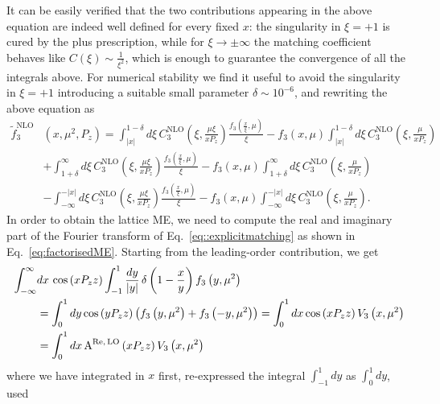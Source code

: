 It can be easily verified that the two contributions appearing in the above
equation are indeed well defined for every fixed $x$: the singularity in
$\xi=+1$ is cured by the plus prescription, while for $\xi\rightarrow \pm
\infty$ the matching coefficient behaves like $C\left(\xi\right)\sim
\frac{1}{\xi^2}$, which is enough to guarantee the convergence of all the
integrals above. For numerical stability we find it useful to avoid the
singularity in $\xi = +1$ introducing a suitable small parameter $\delta \sim
10^{-6}$, and rewriting the above equation as
\begin{equation}
	\label{eq::explicitplus}
	\begin{split}
		\tilde{f}_3^{\text{NLO}}&\left(x,\mu^2,P_z\right)
		=\int_{|x|}^{1-\delta} d\xi\,
		C_3^{\text{NLO}}\left(\xi,\frac{\mu\xi}{xP_z}\right)
		\frac{f_3\left(\frac{x}{\xi},\mu\right)}{\xi} - 
		f_3\left(x,\mu\right) \int_{|x|}^{1-\delta} d\xi\,
		C_3^{\text{NLO}}\left(\xi,\frac{\mu}{xP_z}\right) \\
		& + \int_{1+\delta}^{\infty}d\xi\,
		C_3^{\text{NLO}}\left(\xi,\frac{\mu\xi}{xP_z}\right)
		\frac{f_3\left(\frac{x}{\xi},\mu\right)}{\xi} - 
		f_3\left(x,\mu\right) \int_{1+\delta}^{\infty}d\xi\,
		C_3^{\text{NLO}}\left(\xi,\frac{\mu}{xP_z}\right) \\
		& - \int_{-\infty}^{-|x|} d\xi\, 
		C_3^{\text{NLO}}\left(\xi,\frac{\mu\xi}{xP_z}\right)
		\frac{f_3\left(\frac{x}{\xi},\mu\right)}{\xi} - 
		f_3\left(x,\mu\right) \int_{-\infty}^{-|x|}d\xi\, 
		C_3^{\text{NLO}}\left(\xi,\frac{\mu}{xP_z}\right).
	\end{split}
\end{equation}
%
In order to obtain the lattice ME, we need to compute the real and imaginary part
of the Fourier transform of Eq.~\eqref{eq::explicitmatching} as shown in
Eq.~\eqref{eq:factorisedME}. Starting from the leading-order contribution, we get
\begin{align}
	\label{eq::LO}
	\int_{-\infty}^{\infty}& dx\, \cos\left(x P_z z\right) \int_{-1}^{1} \frac{dy}{|y|}\, \delta\left( 1-\frac{x}{y} \right)  
	f_{3}\left( y, {\mu}^2\right)  \nonumber \\
	&= \int_0^1 dy \cos\left( y P_z z  \right) \left( f_{3}\left( y, {\mu}^2\right) + f_{3}\left( -y, {\mu}^2\right)  \right) = 
	\int_0^1 dx \cos\left( x P_z z  \right) V_3 \left( x, {\mu}^2 \right) \nonumber \\
	&= \int_0^1 dx\, \text{A}^{\text{Re}, \,\text{LO}} \left( x P_z z \right) V_3 \left( x, {\mu}^2 \right)
\end{align}
where we have integrated in $x$ first, re-expressed the integral $\int_{-1}^1 dy$ as $\int_0^1 dy$, used
